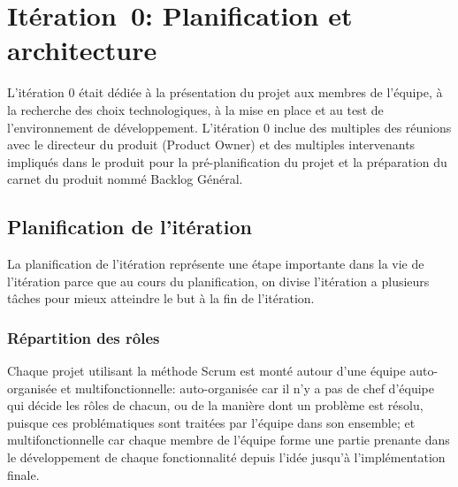 \chapter{Itération~0: Planification et architecture}
\label{sec:sprint0}


L'itération 0 était dédiée à la présentation du projet aux membres de l'équipe,
à la recherche des choix technologiques, à la mise en place et au test de
l'environnement de développement. L'itération 0 inclue des multiples des
réunions avec le directeur du produit (Product Owner) et des multiples
intervenants impliqués dans le produit pour la pré-planification du projet et
la préparation du carnet du produit nommé Backlog Général.


\section{Planification de l'itération}

La planification de l'itération représente une étape importante dans la vie de
l'itération parce que au cours du planification, on divise l'itération a
plusieurs tâches pour mieux atteindre le but à la fin de l'itération.

\subsection{Répartition des rôles}

Chaque projet utilisant la méthode Scrum est monté autour d'une équipe
auto-organisée et multifonctionnelle: auto-organisée car il n'y a pas de chef
d'équipe qui décide les rôles de chacun, ou de la manière dont un problème est
résolu, puisque ces problématiques sont traitées par l'équipe dans son
ensemble; et multifonctionnelle car chaque membre de l'équipe forme une partie
prenante dans le développement de chaque fonctionnalité depuis l'idée jusqu'à
l'implémentation finale.


